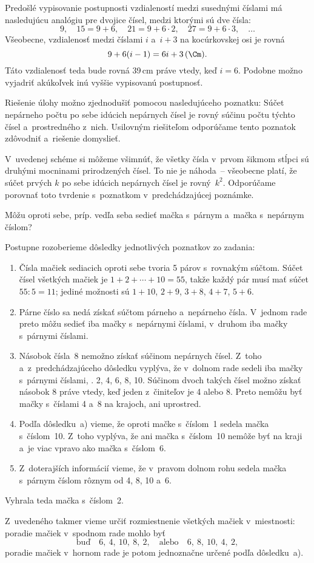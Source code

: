 {Predošlé vypisovanie postupnosti vzdialeností medzi susednými číslami má
nasledujúcu analógiu pre dvojice čísel, medzi ktorými sú dve čísla:
$$
9,\quad 15=9+6,\quad 21=9+6\cdot2,\quad 27=9+6\cdot3,\quad \dots
$$
Všeobecne, vzdialenosť medzi číslami $i$ a~$i+3$ na kocúrkovskej osi
je rovná
$$
9+6(i-1)=6i+3\,(\Cm).
$$
Táto vzdialenosť teda bude rovná 39\,cm práve vtedy, keď $i=6$.
Podobne možno vyjadriť akúkoľvek inú vyššie vypisovanú postupnosť.

\smallskip
Riešenie úlohy možno zjednodušiť pomocou nasledujúceho poznatku:
Súčet nepárneho počtu po sebe idúcich nepárnych čísel je rovný súčinu počtu
týchto čísel a~prostredného z~nich.
Usilovným riešiteľom odporúčame tento poznatok zdôvodniť a~riešenie domyslieť.

\smallskip
V~uvedenej schéme si môžeme všimnúť, že všetky čísla v~prvom šikmom stĺpci
sú druhými mocninami prirodzených čísel.
To nie je náhoda~-- všeobecne platí, že súčet prvých $k$ po sebe idúcich nepárnych
čísel je rovný~$k^2$.
Odporúčame porovnať toto tvrdenie s~poznatkom v~predchádzajúcej poznámke.
}

{%
\napad
Môžu oproti sebe, príp. vedľa seba sedieť mačka s~párnym a~mačka s~nepárnym číslom?

\riesenie
Postupne rozoberieme dôsledky jednotlivých poznatkov zo zadania:
\begin{enumerate}\alphatrue
\item
Čísla mačiek sediacich oproti sebe tvoria 5 párov s~rovnakým súčtom.
Súčet čísel všetkých mačiek je $1+2+\cdots+10=55$, takže každý pár musí mať
súčet $55:5=11$; jediné možnosti sú
$1+10$, $2+9$, $3+8$, $4+7$, $5+6$.
\item
Párne číslo sa nedá získať súčtom párneho a~nepárneho čísla.
V~jednom rade preto môžu sedieť iba mačky s~nepárnymi číslami, v~druhom iba
mačky s~párnymi číslami.
\item
Násobok čísla~8 nemožno získať súčinom nepárnych čísel.
Z~toho a~z~predchádzajúceho dôsledku vyplýva, že v~dolnom rade sedeli iba mačky
s~párnymi číslami, \tj. 2, 4, 6, 8, 10.
Súčinom dvoch takých čísel možno získať násobok 8 práve vtedy, keď jeden
z~činiteľov je 4 alebo 8.
Preto nemôžu byť mačky s~číslami 4 a~8 na krajoch, ani uprostred.
\item
Podľa dôsledku~a) vieme, že oproti mačke s~číslom~1 sedela mačka s~číslom~10.
Z~toho vyplýva, že ani mačka s~číslom~10 nemôže byť na kraji a~je viac vpravo
ako mačka s~číslom~6.
\item
Z~doterajších informácií vieme, že v~pravom dolnom rohu sedela mačka
s~párnym číslom rôznym od 4, 8, 10 a~6.
\end{enumerate}
Vyhrala teda mačka s~číslom~2.

\poznamka
Z~uvedeného takmer vieme určiť rozmiestnenie všetkých mačiek v~miestnosti:
poradie mačiek v~spodnom rade mohlo byť
$$
\text{buď}\quad 6,\ 4,\ 10,\ 8,\ 2,\quad
\text{alebo}\quad 6,\ 8,\ 10,\ 4,\ 2,
$$
poradie mačiek v~hornom rade je potom jednoznačne určené podľa dôsledku~a).
}

